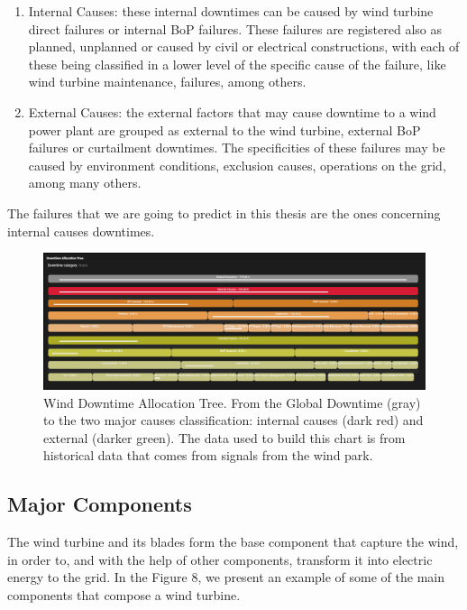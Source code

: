 \begin{enumerate}
    \item 
Internal Causes: these internal downtimes can be caused by wind turbine direct failures or internal BoP failures. These failures are registered also as planned, unplanned or caused by civil or electrical constructions, with each of these being classified in a lower level of the specific cause of the failure, like wind turbine maintenance, failures, among others.

    \item
External Causes: the external factors that may cause downtime to a wind power plant are grouped as external to the wind turbine, external BoP failures or curtailment downtimes. The specificities of these failures may be caused by environment conditions, exclusion causes, operations on the grid, among many others.
\end{enumerate}

The failures that we are going to predict in this thesis are the ones concerning internal causes downtimes.

\begin{figure}[htbp]
	\centering
	\includegraphics[angle=-90,height=0.5\textheight, width=\textwidth]{Chapters/Figures/background_fig7.PNG}
	\caption{Wind Downtime Allocation Tree. From the Global Downtime (gray) to the two major causes classification: internal causes (dark red) and external (darker green). The data used to build this chart is from historical data that comes from signals from the wind park.}
	\label{fig:Figuras_Tree_silhouettes-vectorial}
\end{figure}


\subsection{Major Components} 
\label{sub:if_you_use_this_template} 

The wind turbine and its blades form the base component that capture the wind, in order to, and with the help of other components, transform it into electric energy to the grid. In the Figure 8, we present an example of some of the main components that compose a wind turbine.


